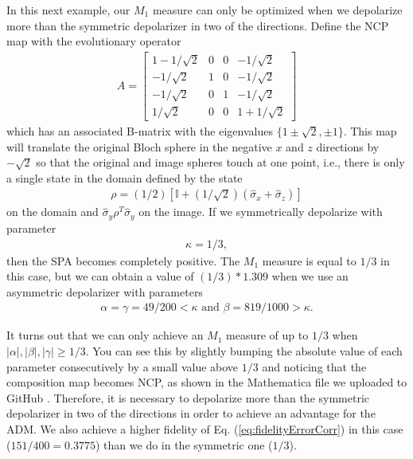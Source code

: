 \documentclass[12pt]{iopart}
\begin{document}
In this next example, our $M_1$ measure can only be optimized when we depolarize more than the symmetric depolarizer in two of the directions. Define the NCP map with the evolutionary operator
\begin{align}
    A = 
    \left[
    \begin{array}{cccc}
       1-1/\sqrt{2} & 0 & 0 & -1/\sqrt{2} \\
       -1/\sqrt{2} & 1 & 0 & -1/\sqrt{2} \\
       -1/\sqrt{2} & 0 & 1 & -1/\sqrt{2} \\
       1/\sqrt{2} & 0 & 0 & 1+1/\sqrt{2}
    \end{array}
    \right]
\end{align}
which has an associated B-matrix with the eigenvalues $\{ 1 \pm \sqrt{2}, \pm 1 \}$. This map will translate the original Bloch sphere in the negative $x$ and $z$ directions by $-\sqrt{2}$ so that the original and image spheres touch at one point, i.e., there is only a single state in the domain defined by the state 
\begin{align}
    \rho = (1/2)[\mathbb{I} + (1/\sqrt{2})(\hat{\sigma}_x + \hat{\sigma}_z)]    
\end{align}
on the domain and $\hat{\sigma}_y \rho^T \hat{\sigma}_y$ on the image. If we symmetrically depolarize with parameter 
\begin{align}
    \kappa = 1/3,
\end{align} 
then the SPA becomes completely positive. The $M_1$ measure is equal to $1/3$ in this case, but we can obtain a value of $(1/3)*1.309$ when we use an asymmetric depolarizer with parameters 
\begin{align}
    \alpha = \gamma = 49/200 < \kappa \text{ and }\beta = 819/1000 > \kappa.
\end{align}

It turns out that we can only achieve an $M_1$ measure of up to $1/3$ when $|\alpha|, |\beta|, |\gamma| \geq 1/3$. You can see this by slightly bumping the absolute value of each parameter consecutively by a small value above $1/3$ and noticing that the composition map becomes NCP, as shown in the Mathematica file we uploaded to GitHub \cite{github_dilley}. Therefore, it is necessary to depolarize more than the symmetric depolarizer in two of the directions in order to achieve an advantage for the ADM. We also achieve a higher fidelity of Eq. (\ref{eq:fidelityErrorCorr}) in this case ($151/400 = 0.3775$) than we do in the symmetric one ($1/3$).
\end{document}
